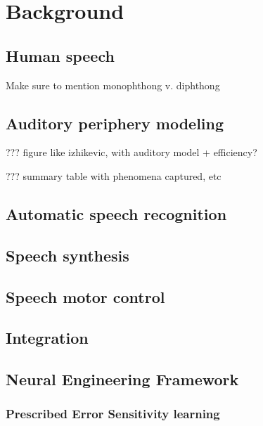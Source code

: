 \chapter{Background}

\section{Human speech}

Make sure to mention monophthong v. diphthong

\section{Auditory periphery modeling}

??? figure like izhikevic, with auditory model + efficiency?

??? summary table with phenomena captured, etc

\section{Automatic speech recognition}

\section{Speech synthesis}

\section{Speech motor control}

\section{Integration}

\section{Neural Engineering Framework}

\subsection{Prescribed Error Sensitivity learning}



